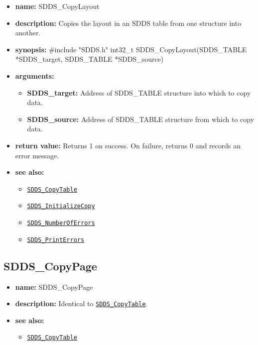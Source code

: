 \documentclass[11pt]{article}
\newcommand{\progref}[1]{\hyperref[SDDS_#1]{\tt SDDS\_#1}}
\begin{document}
\begin{itemize}
\item {\bf name:}\newline
SDDS\_CopyLayout
\item {\bf description:}\newline
Copies the layout in an SDDS table from one structure into another.
\item {\bf synopsis:} \#include "SDDS.h"\newline
int32\_t SDDS\_CopyLayout(SDDS\_TABLE *SDDS\_target, SDDS\_TABLE *SDDS\_source)
\item {\bf arguments:}
\begin{itemize}
\item {\bf SDDS\_target:} Address of SDDS\_TABLE structure into which to copy data.
\item {\bf SDDS\_source:} Address of SDDS\_TABLE structure from which to copy data.
\end{itemize}
\item {\bf return value:}\newline
Returns 1 on success. On failure, returns 0 and records an error message.
\item {\bf see also:}
\begin{itemize}
\item \progref{CopyTable}
\item \progref{InitializeCopy}
\item \progref{NumberOfErrors}
\item \progref{PrintErrors}
\end{itemize}
\end{itemize}

\subsection{SDDS\_CopyPage}
\label{SDDS_CopyPage}

\begin{itemize}
\item {\bf name:}\newline
SDDS\_CopyPage
\item {\bf description:}\newline
Identical to \progref{CopyTable}.
\item {\bf see also:}
\begin{itemize}
\item \progref{CopyTable}
\end{itemize}
\end{itemize}
\end{document}
